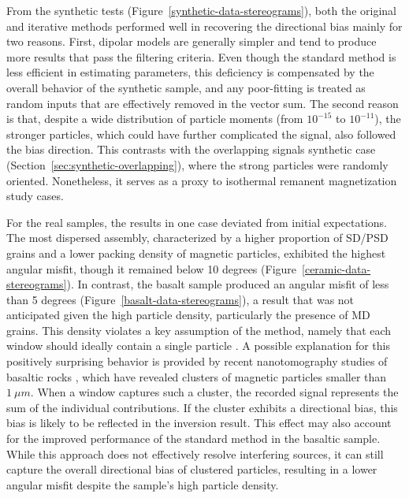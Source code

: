 From the synthetic tests (Figure~\ref{synthetic-data-stereograms}), both the original \citep{Souza-Junior2024} and iterative methods performed well in recovering the directional bias mainly for two reasons. First, dipolar models are generally simpler and tend to produce more results that pass the filtering criteria. Even though the standard method is less efficient in estimating parameters, this deficiency is compensated by the overall behavior of the synthetic sample, and any poor-fitting is treated as random inputs that are effectively removed in the vector sum. The second reason is that, despite a wide distribution of particle moments (from \(10^{-15}\) to \(10^{-11}\)), the stronger particles, which could have further complicated the signal, also followed the bias direction. This contrasts with the overlapping signals synthetic case (Section~\ref{sec:synthetic-overlapping}), where the strong particles were randomly oriented. Nonetheless, it serves as a proxy to isothermal remanent magnetization study cases.


For the real samples, the results in one case deviated from initial expectations. The most dispersed assembly, characterized by a higher proportion of SD/PSD grains and a lower packing density of magnetic particles, exhibited the highest angular misfit, though it remained below 10 degrees (Figure~\ref{ceramic-data-stereograms}). In contrast, the basalt sample produced an angular misfit of less than 5 degrees (Figure~\ref{basalt-data-stereograms}), a result that was not anticipated given the high particle density, particularly the presence of MD grains. This density violates a key assumption of the method, namely that each window should ideally contain a single particle \citep{Souza-Junior2024}. A possible explanation for this positively surprising behavior is provided by recent nanotomography studies of basaltic rocks \citep[\textit{e.g.}][]{Out2024, Out2025}, which have revealed clusters of magnetic particles smaller than \(1~\mu m\). When a window captures such a cluster, the recorded signal represents the sum of the individual contributions. If the cluster exhibits a directional bias, this bias is likely to be reflected in the inversion result. This effect may also account for the improved performance of the standard method in the basaltic sample. While this approach does not effectively resolve interfering sources, it can still capture the overall directional bias of clustered particles, resulting in a lower angular misfit despite the sample’s high particle density.

